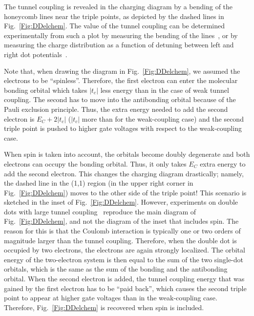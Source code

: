\documentclass[12pt,aps,nofootinbib]{revtex4-1}
\begin{document}
The tunnel coupling is revealed in the charging diagram by a bending of
the honeycomb lines near the triple points, as depicted by the
dashed lines in Fig.~\ref{Fig:DDelchem}. The value of the tunnel
coupling can be determined experimentally from such a plot
by measuring the bending of the
lines~\cite{PioroPRB2005,HuttelPRB2005}, or by measuring the
charge distribution as a function of detuning between left and
right dot potentials~\cite{DiCarlo_sensing,PettaPRL2004}.

Note that, when drawing the diagram in Fig.~\ref{Fig:DDelchem}, we
assumed the electrons to be ``spinless''. Therefore, the first
electron can enter the molecular bonding orbital which takes $\left| t_c \right|$ less energy than in the case of weak tunnel coupling. The
second has to move into the antibonding orbital because of the Pauli exclusion principle. Thus, the extra energy needed to add the second electron is $E_C+2\left| t_c \right|$ ($\left| t_c \right|$ more than for the weak-coupling case) and the second triple point is pushed to higher gate voltages with respect to the weak-coupling case.

When spin is taken into account, the orbitals become doubly degenerate and both electrons can
occupy the bonding orbital. Thus, it only takes $E_C$ extra energy to add the second electron. This changes the charging diagram
drastically; namely, the dashed line in the (1,1) region (in the upper right corner in Fig.~\ref{Fig:DDelchem}) moves to the other side of the triple point! This scenario is sketched in the inset of Fig.~\ref{Fig:DDelchem}.
However, experiments on double dots with large tunnel coupling~\cite{PioroPRB2005,HuttelPRB2005} reproduce
the main diagram of Fig.~\ref{Fig:DDelchem}, and not the diagram of the inset that includes spin.
The reason for this is that the Coulomb interaction is typically
one or two orders of magnitude larger than the tunnel coupling.
Therefore, when the double dot is occupied by two electrons, the
electrons are again strongly localized. The orbital energy of the
two-electron system is then equal to the sum of the two single-dot
orbitals, which is the same as the sum of the bonding and the
antibonding orbital. When the second electron is added, the tunnel coupling energy that was gained by the first electron has to be ``paid back'', which causes the second triple point to appear at higher gate voltages than in the weak-coupling case. Therefore, Fig.~\ref{Fig:DDelchem} is
recovered when spin is included.
\end{document}
